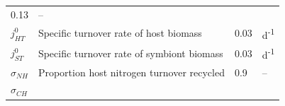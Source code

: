 \documentclass[]{elsarticle} %
\begin{document}
\begin{longtable}[c]{@{}llll@{}}
\begin{minipage}[t]{0.09\columnwidth}
0.13
\strut\end{minipage} &
\begin{minipage}[t]{0.23\columnwidth}\raggedright\strut
--
\strut\end{minipage}\tabularnewline
\begin{minipage}[t]{0.10\columnwidth}\raggedright\strut
\(j_{HT}^0\)
\strut\end{minipage} &
\begin{minipage}[t]{0.48\columnwidth}\raggedright\strut
Specific turnover rate of host biomass
\strut\end{minipage} &
\begin{minipage}[t]{0.09\columnwidth}\raggedright\strut
0.03
\strut\end{minipage} &
\begin{minipage}[t]{0.23\columnwidth}\raggedright\strut
d\textsuperscript{-1}
\strut\end{minipage}\tabularnewline
\begin{minipage}[t]{0.10\columnwidth}\raggedright\strut
\(j_{ST}^0\)
\strut\end{minipage} &
\begin{minipage}[t]{0.48\columnwidth}\raggedright\strut
Specific turnover rate of symbiont biomass
\strut\end{minipage} &
\begin{minipage}[t]{0.09\columnwidth}\raggedright\strut
0.03
\strut\end{minipage} &
\begin{minipage}[t]{0.23\columnwidth}\raggedright\strut
d\textsuperscript{-1}
\strut\end{minipage}\tabularnewline
\begin{minipage}[t]{0.10\columnwidth}\raggedright\strut
\(\sigma_{NH}\)
\strut\end{minipage} &
\begin{minipage}[t]{0.48\columnwidth}\raggedright\strut
Proportion host nitrogen turnover recycled
\strut\end{minipage} &
\begin{minipage}[t]{0.09\columnwidth}\raggedright\strut
0.9
\strut\end{minipage} &
\begin{minipage}[t]{0.23\columnwidth}\raggedright\strut
--
\strut\end{minipage}\tabularnewline
\begin{minipage}[t]{0.10\columnwidth}\raggedright\strut
\(\sigma_{CH}\)
\strut\end{minipage} &
\begin{minipage}[t]{0.48\columnwidth}\raggedright\strut

\end{minipage}
\end{longtable}
\end{document}
